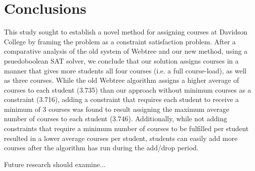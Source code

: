 
\section{Conclusions}
\label{sec:concl}

This study sought to establish a novel method for assigning courses at
Davidson College by framing the problem as a constraint satisfaction
problem. After a comparative analysis of the old system of Webtree and
our new method, using a psuedoboolean SAT solver, we conclude that our
solution assigns courses in a manner that gives more students all four
courses (i.e. a full course-load), as well as three courses. While the
old Webtree algorithm assigns a higher average of courses to each
student (3.735) than our approach without minimum courses as a
constraint (3.716), adding a constraint that requires each student to
receive a minimum of 3 courses was found to result assigning the
maximum average number of courses to each student
(3.746). Additionally, while not adding constraints that require a
minimum number of courses to be fulfilled per student resulted in a
lower average courses per student, students can easily add more
courses after the algorithm has run during the add/drop period. 

Future research should examine...